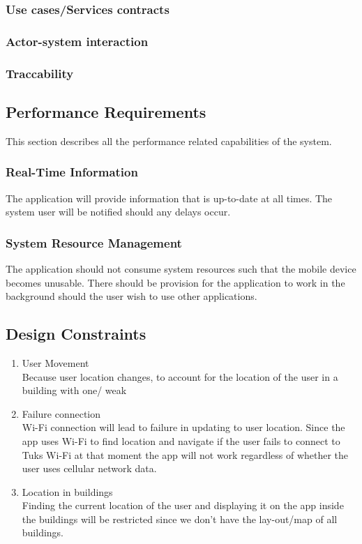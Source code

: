 \documentclass[a4paper,10pt]{article}
\begin{document}
	\subsubsection{Use cases/Services contracts} 
	\subsubsection{Actor-system interaction}
	\subsubsection{Traccability}


	
	\subsection{Performance Requirements}
   This section describes all the performance related capabilities of the system.
               \subsubsection{Real-Time Information}
  The application will provide information that is up-to-date at all times. The system user will be notified should any delays occur. 
               \subsubsection{System Resource Management}
   The application should not consume system resources such that the mobile device becomes unusable. There should be provision for the application to work in the background should the user wish to use other applications.
   
	\subsection{Design Constraints}
		\begin{enumerate}
		\item 	User Movement \\
Because user location changes, to account for the location of the user in a building with one/ weak 
			
		\item 	Failure connection \\
Wi-Fi connection will lead to failure in updating to user location. Since the app uses Wi-Fi to find location and navigate if the user fails to connect to Tuks Wi-Fi at that moment the app will not work regardless of whether the user uses cellular network data.	
					
		\item Location in buildings \\
Finding the current location of the user and displaying it on the app inside the buildings will be restricted since we don't have the lay-out/map of all buildings.	
		\end{enumerate}				
\end{document}

